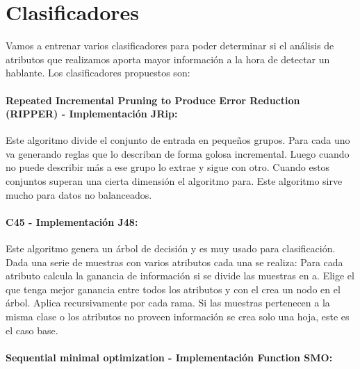 \documentclass[11pt,a4paper,twoside]{tesis}
\begin{document}
\section{Clasificadores}

Vamos a entrenar varios clasificadores para poder determinar si el análisis de atributos que realizamos aporta mayor información a la hora de detectar un hablante. Los clasificadores propuestos son: 

\paragraph{Repeated Incremental Pruning to Produce Error Reduction (RIPPER) - Implementación JRip:}


Este algoritmo divide el conjunto de entrada en pequeños grupos. Para cada uno va generando reglas que lo describan de forma golosa incremental. Luego cuando no puede describir más a ese grupo lo extrae y sigue con otro. Cuando estos conjuntos superan una cierta dimensión el algoritmo para. Este algoritmo sirve mucho para datos no balanceados.

\paragraph{C45 - Implementación J48:}


Este algoritmo genera un árbol de decisión y es muy usado para clasificación. Dada una serie de muestras con varios atributos cada una se realiza: Para cada atributo calcula la ganancia de información si se divide las muestras en a. Elige el que tenga mejor ganancia entre todos los atributos y con el crea un nodo en el árbol. Aplica recursivamente por cada rama. Si las muestras pertenecen a la misma clase o los atributos no proveen información se crea solo una hoja, este es el caso base.

\paragraph{Sequential minimal optimization - Implementación Function SMO:}
\end{document}
